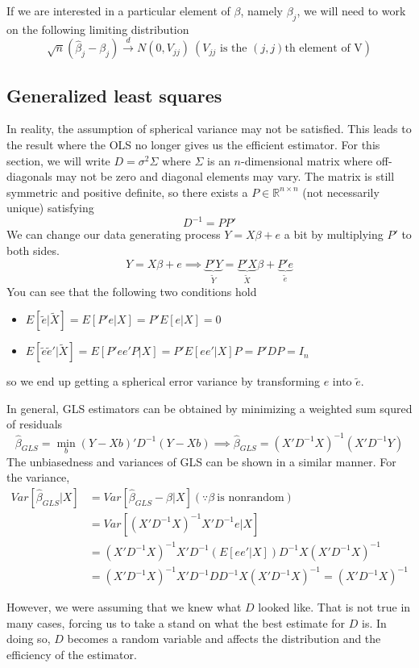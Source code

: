 \documentclass[12pt]{article}
\theoremstyle{definition}
\theoremstyle{property}
\theoremstyle{assumption}
\theoremstyle{example}
\theoremstyle{comment}
\begin{document}
If we are interested in a particular element of $\beta$, namely $\beta_j$, we will need to work on the following limiting distribution
\[
\sqrt{n}(\hat{\beta}_j-\beta_j) \xrightarrow{d} N(0,V_{jj}) \ (V_{jj} \text{ is the $(j,j)$th element of V})
\]
\subsection{Generalized least squares}
In reality, the assumption of spherical variance may not be satisfied. This leads to the result where the OLS no longer gives us the efficient estimator. For this section, we will write $D=\sigma^2\Sigma$ where $\Sigma$ is an $n$-dimensional matrix where off-diagonals may not be zero and diagonal elements may vary. The matrix is still symmetric and positive definite, so there exists a $P\in\mathbb{R}^{n\times n}$ (not necessarily unique) satisfying
\[
D^{-1}= PP'
\]
We can change our data generating process $Y=X\beta+e$ a bit by multiplying $P'$ to both sides.
\[
Y=X\beta+e \implies \underbrace{P'Y}_{\tilde{Y}}=\underbrace{P'X}_{\tilde{X}}\beta+\underbrace{P'e}_{\tilde{e}}
\]
You can see that the following two conditions hold
\begin{itemize}
\item $E[\tilde{e}|\tilde{X}]=E[P'e|X]=P'E[e|X]=0$
\item $E[\tilde{e}\tilde{e}'|\tilde{X}]=E[P'ee'P|X]=P'E[ee'|X]P=P'DP=I_n$
\end{itemize}
so we end up getting a spherical error variance by transforming $e$ into $\tilde{e}$.  \par
In general, GLS estimators can be obtained by minimizing a weighted sum squred of residuals
\[
\hat{\beta}_{GLS} = \min_b (Y-Xb)'D^{-1}(Y-Xb) \implies \hat{\beta}_{GLS}=(X'D^{-1}X)^{-1}(X'D^{-1}Y)
\]
The unbiasedness and variances of GLS can be shown in a similar manner. For the variance, 
\[
\begin{aligned}
Var[\hat{\beta}_{GLS}|X]&=Var[\hat{\beta}_{GLS}-\beta|X] (\because \beta\ \text{is nonrandom})\\
 &=Var[(X'D^{-1}X)^{-1}X'D^{-1}e|X] \\
 &=(X'D^{-1}X)^{-1}X'D^{-1}(E[ee'|X])D^{-1}X(X'D^{-1}X)^{-1} \\
 &=(X'D^{-1}X)^{-1}X'D^{-1}DD^{-1}X(X'D^{-1}X)^{-1} =(X'D^{-1}X)^{-1}
\end{aligned}
\] \par
However, we were assuming that we knew what $D$ looked like. That is not true in many cases, forcing us to take a stand on what the best estimate for $D$ is. In doing so, $D$ becomes a random variable and affects the distribution and the efficiency of the estimator. 
\end{document}
